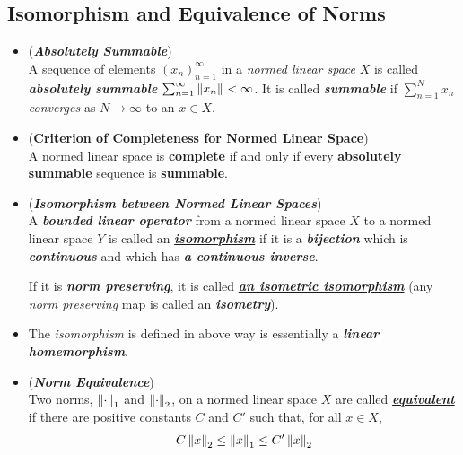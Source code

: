 \documentclass[11pt]{article}
\begin{document}
\subsection{Isomorphism and Equivalence of Norms}
\begin{itemize}
\item \begin{definition} (\emph{\textbf{Absolutely Summable}})\\
A sequence of elements $(x_n)_{n=1}^{\infty}$ in a \emph{normed linear space} $X$ is called \emph{\textbf{absolutely summable}} $\sum_{n=1}^{\infty}\left\|x_n\right\|_{} < \infty$. It is called \emph{\textbf{summable}} if $\sum_{n=1}^{N}x_n$ \emph{converges} as $N \rightarrow\infty$ to an $x \in X$.
\end{definition}

\item \begin{proposition} (\textbf{Criterion of Completeness for Normed Linear Space}) \citep{reed1980methods} \\
A normed linear space is \textbf{complete} if and only if every \textbf{absolutely summable} sequence is \textbf{summable}.
\end{proposition}

\item \begin{definition} (\emph{\textbf{Isomorphism between Normed Linear Spaces}})\\
A \textit{\textbf{bounded linear operator}} from a normed linear space $X$ to a normed linear space $Y$ is called an \underline{\emph{\textbf{isomorphism}}} if it is a \emph{\textbf{bijection}} which is \emph{\textbf{continuous}} and which has \emph{\textbf{a continuous inverse}}. 

If it is \emph{\textbf{norm preserving}}, it is called \underline{\emph{\textbf{an isometric isomorphism}}} (any \emph{norm preserving} map is called an \emph{\textbf{isometry}}).
\end{definition}

\item \begin{remark}
The \emph{isomorphism} is defined in above way is essentially a \emph{\textbf{linear homemorphism}}.
\end{remark}

\item \begin{definition} (\emph{\textbf{Norm Equivalence}})\\
Two norms, $\left\|\cdot\right\|_{1}$ and $\left\|\cdot\right\|_{2}$, on a normed linear space $X$ are called \underline{\emph{\textbf{equivalent}}} if there are positive constants $C$ and $C'$ such that, for all $x \in X$,
\begin{align*}
C\left\|x\right\|_{2} \le \left\|x\right\|_{1} \le C'\left\|x\right\|_{2}
\end{align*}
\end{definition}


\end{itemize}
\end{document}
